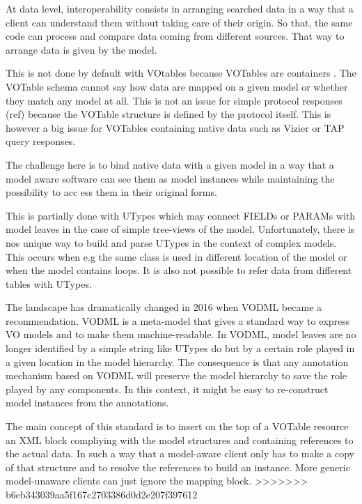 At data level, interoperability consists in arranging searched data in a way that a client can understand them without taking care of their origin. So that, the same code
 can process and compare data coming from different sources.  That way to arrange data is given by the model.

This is not done by default with VOtables because VOTables are containers \citep{2019ivoa.spec.1021O}. The VOTable schema cannot say how data are mapped on a given model 
or whether they match any model at all. This is not an issue for simple protocol responses (ref) because the VOTable structure is defined by the protocol itself. This is 
however a big issue for VOTables containing native data such as Vizier  or TAP query responses.

The challenge here is to bind native data with a given model in a way that a model aware software can see them as model instances while maintaining the possibility to acc
ess them in their original forms.

This is partially done with UTypes which may connect FIELDs or PARAMs with model leaves in the case of simple tree-views of the model. Unfortunately, there is nos unique 
 way to build and parse UTypes in the context of complex models. This occurs when e.g the same class is used in different location of the model or when the model contains
 loops. It is also not possible to refer data from different tables with  UTypes.

The landscape has dramatically changed in 2016 when VODML \citep{2018ivoa.spec.0910L} became a recommendation. VODML is a meta-model that gives a standard way to express 
VO models and to make them machine-readable.
In VODML, model leaves are no longer identified by a simple string like UTypes do but by a certain role played in a given location in the model hierarchy.
The consequence is that any annotation mechanism based on VODML will preserve the model hierarchy to save the role played by any components. In this context, it might be 
easy to re-construct model instances from the annotations. 

The main concept of this standard is to insert on the  top of a VOTable resource an XML block compliying with the model structures and containing references to the actual
 data.
In such a way that a model-aware client only has to make a copy of that structure and to resolve the references  to build an instance. More generic model-unaware clients 
can just ignore the mapping block. 
>>>>>>> b6eb343039aa5f167c2703386d0d2e207f397612

